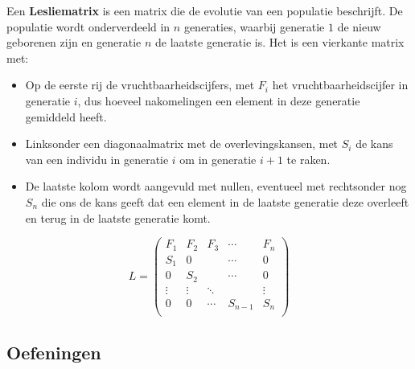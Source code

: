 \documentclass[12pt,twoside]{article}
\begin{document}
Een {\bf Lesliematrix} is een matrix die de evolutie van een populatie beschrijft. De populatie wordt onderverdeeld in $n$ generaties, waarbij generatie $1$ de nieuw geborenen zijn en generatie $n$ de laatste generatie is. Het is een vierkante matrix met:
\begin{itemize}
\item Op de eerste rij de vruchtbaarheidscijfers, met $F_i$ het vruchtbaarheidscijfer in generatie $i$, dus hoeveel nakomelingen een element in deze generatie gemiddeld heeft.
\item Linksonder een diagonaalmatrix met de overlevingskansen, met $S_i$ de kans van een individu in generatie $i$ om in generatie $i+1$ te raken.
\item De laatste kolom wordt aangevuld met nullen, eventueel met rechtsonder nog $S_n$ die ons de kans geeft dat een element in de laatste generatie deze overleeft en terug in de laatste generatie komt.
\end{itemize}
\[
  L =
  \begin{pmatrix}
    F_1 & F_2 & F_3 & \cdots       & F_n \\
    S_1 & 0   &     & \cdots       & 0   \\
    0   & S_2 &     & \cdots       & 0   \\
    \vdots   & \vdots   & \ddots   &         & \vdots   \\
    0   & 0   & \cdots   & S_{n-1} & S_n \\
  \end{pmatrix}
\]

\needspace{5cm}
\subsection{Oefeningen}
\end{document}
